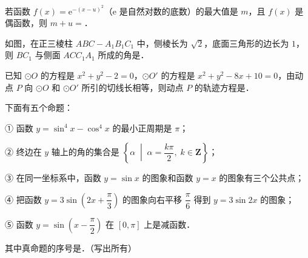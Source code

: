 \begin{question}
若函数 $f(x)=\mathrm{e}^{-(x-u)^2}$（$\mathrm{e}$ 是自然对数的底数）的最大值是 $m$，且 $f(x)$ 是偶函数，则 $m+u=$\gkblank{}．

\Needspace{0.4\textheight}
\end{question}
\begin{question}
如图，在正三棱柱 $ABC-A_1B_1C_1$ 中，侧棱长为 $\sqrt2$，底面三角形的边长为 $1$，则 $BC_1$ 与侧面 $ACC_1A_1$ 所成的角是\gkblank{}．
\nopagebreak[4]
\begin{center}\end{center}
\nopagebreak[4]
\end{question}
\begin{question}
已知 $\odot O$ 的方程是 $x^2+y^2-2=0$，$\odot O'$ 的方程是 $x^2+y^2-8x+10=0$，由动点 $P$ 向 $\odot O$ 和 $\odot O'$ 所引的切线长相等，则动点 $P$ 的轨迹方程是\gkblank{}．

\end{question}
\begin{question}
下面有五个命题：

① 函数 $y=\sin^4x-\cos^4x$ 的最小正周期是 $\pi$；

② 终边在 $y$ 轴上的角的集合是 $\left\{\alpha\;\middle|\;\alpha=\dfrac{k\pi}{2},\;k\in\mathbf Z\right\}$；

③ 在同一坐标系中，函数 $y=\sin x$ 的图象和函数 $y=x$ 的图象有三个公共点；

④ 把函数 $y=3\sin\left(2x+\dfrac{\pi}{3}\right)$ 的图象向右平移 $\dfrac{\pi}{6}$ 得到 $y=3\sin2x$ 的图象；

⑤ 函数 $y=\sin\left(x-\dfrac{\pi}{2}\right)$ 在 $[0,\pi]$ 上是减函数．

其中真命题的序号是\gkblank{}．（写出所有）

\end{question}

